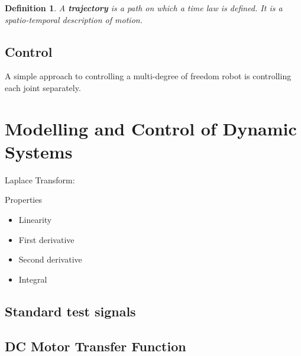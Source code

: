 \documentclass[10pt,a4paper]{scrartcl}
\newtheorem{define}{Definition}
\begin{document}
\begin{multicols*}{2}
\begin{define}
A \textbf{trajectory} is a path on which a time law is defined. It is a spatio-temporal description of motion.
\end{define}

\subsection{Control}

A simple approach to controlling a multi-degree of freedom robot is controlling each joint separately.

\section{Modelling and Control of Dynamic Systems}

Laplace Transform:


Properties
\begin{itemize}
\item Linearity
\item First derivative
\item Second derivative
\item Integral
\end{itemize}


\subsection{Standard test signals}


\subsection{DC Motor Transfer Function}



\end{multicols*}
\end{document}
